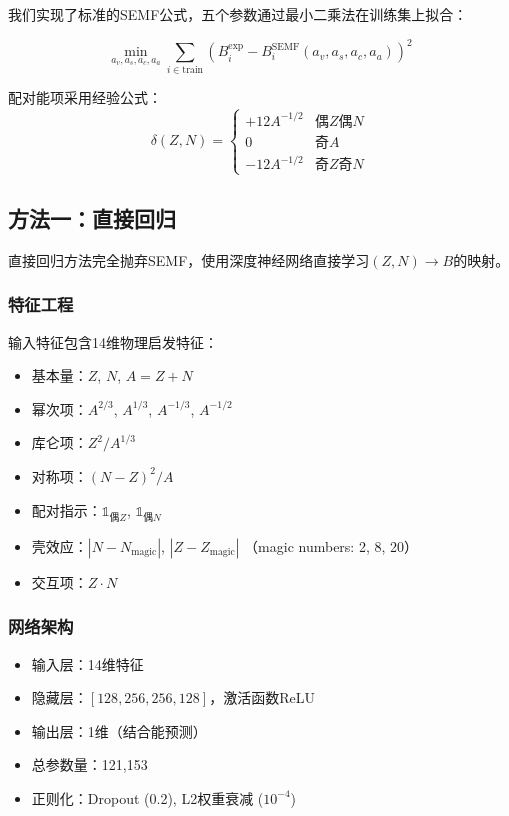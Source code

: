 \documentclass[12pt, a4paper]{article}
\begin{document}
我们实现了标准的SEMF公式，五个参数通过最小二乘法在训练集上拟合：

\begin{equation}
  \min_{a_v, a_s, a_c, a_a} \sum_{i \in \text{train}}
  \left( B_i^{\text{exp}} - B_i^{\text{SEMF}}(a_v, a_s, a_c, a_a) \right)^2
\end{equation}

配对能项采用经验公式：
\begin{equation}
  \delta(Z, N) = \begin{cases}
    +12 A^{-1/2} & \text{偶}Z\text{偶}N \\
    0 & \text{奇}A \\
    -12 A^{-1/2} & \text{奇}Z\text{奇}N
  \end{cases}
\end{equation}

\subsection{方法一：直接回归}

直接回归方法完全抛弃SEMF，使用深度神经网络直接学习$(Z, N) \to B$的映射。

\subsubsection{特征工程}

输入特征包含14维物理启发特征：
\begin{itemize}
  \item 基本量：$Z$, $N$, $A = Z + N$
  \item 幂次项：$A^{2/3}$, $A^{1/3}$, $A^{-1/3}$, $A^{-1/2}$
  \item 库仑项：$Z^2 / A^{1/3}$
  \item 对称项：$(N - Z)^2 / A$
  \item 配对指示：$\mathbb{1}_{\text{偶}Z}$, $\mathbb{1}_{\text{偶}N}$
  \item 壳效应：$|N - N_{\text{magic}}|$, $|Z - Z_{\text{magic}}|$
        （magic numbers: 2, 8, 20）
  \item 交互项：$Z \cdot N$
\end{itemize}

\subsubsection{网络架构}

\begin{itemize}
  \item 输入层：14维特征
  \item 隐藏层：$[128, 256, 256, 128]$，激活函数ReLU
  \item 输出层：1维（结合能预测）
  \item 总参数量：121,153
  \item 正则化：Dropout (0.2), L2权重衰减 ($10^{-4}$)
\end{itemize}
\end{document}
